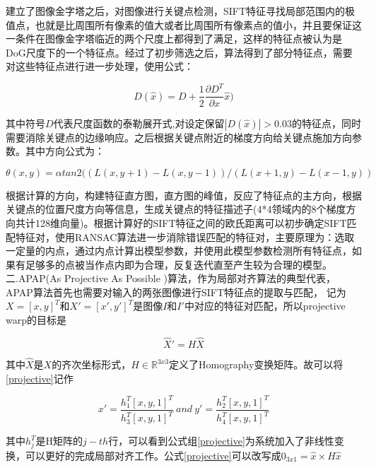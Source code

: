 建立了图像金字塔之后，对图像进行关键点检测，SIFT特征寻找局部范围内的极值点，也就是比周围所有像素的值大或者比周围所有像素点的值小，并且要保证这一条件在图像金字塔临近的两个尺度上都得到了满足，这样的特征点被认为是DoG尺度下的一个特征点。经过了初步筛选之后，算法得到了部分特征点，需要对这些特征点进行进一步处理，使用公式：
\begin{center}
  \begin{equation}\label{taylor}
    D(\hat{x})=D+\frac{1}{2}\frac{\partial D^T}{\partial x}\hat{x})
  \end{equation}
\end{center}
其中符号$D$代表尺度函数的泰勒展开式,对设定保留$|D(\hat{x})|>0.03$的特征点，同时需要消除关键点的边缘响应。之后根据关键点附近的梯度方向给关键点施加方向参数。其中方向公式为：
\begin{center}
  \begin{equation}\label{sift-ori}
    \theta(x,y)=\alpha tan2((L(x,y+1)-L(x,y-1))/(L(x+1,y)-L(x-1,y))
  \end{equation}
\end{center}
根据计算的方向，构建特征直方图，直方图的峰值，反应了特征点的主方向，根据关键点的位置尺度方向等信息，生成关键点的特征描述子(4*4领域内的8个梯度方向共计128维向量)。根据计算好的SIFT特征之间的欧氏距离可以初步确定SIFT匹配特征对，使用RANSAC算法进一步消除错误匹配的特征对，主要原理为：选取一定量的内点，通过内点计算出模型参数，并使用此模型参数检测所有特征点，如果有足够多的点被当作点内即为合理，反复迭代直至产生较为合理的模型。\\
二.APAP(As Projective As Possible )算法，作为局部对齐算法的典型代表，APAP算法首先也需要对输入的两张图像进行SIFT特征点的提取与匹配，
记为$X=[x,y]^T$和$X'=[x',y']^T$是图像$I$和$I'$中对应的特征对匹配，所以projective warp的目标是
\begin{center}
  \begin{equation}\label{projective}
    \hat{X}'=H\hat{X}
  \end{equation}
\end{center}
其中$\hat{X}$是$X$的齐次坐标形式，$H \in \mathbb{R}^{3x3}$定义了Homography变换矩阵。故可以将\ref{projective}记作
\begin{center}
  \begin{equation}\label{warp_and}
    x'=\frac{h_1^T[x,y,1]^T}{h_3^T[x,y,1]^T} ~and~ y'=\frac{h_2^T[x,y,1]^T}{h_4^T[x,y,1]^T}
  \end{equation}
\end{center}
其中$h_j^T$是H矩阵的$j-th$行，可以看到公式组\ref{projective}为系统加入了非线性变换，可以更好的完成局部对齐工作。公式\ref{projective}可以改写成$0_{3x1}=\hat{x}\times H\hat{x}$
